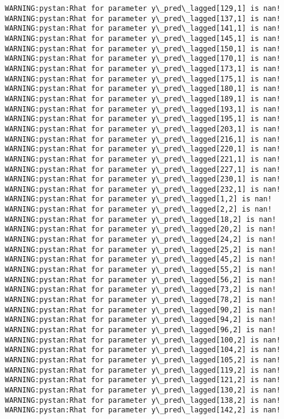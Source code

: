 \documentclass[11pt]{article}
\begin{document}
\begin{Verbatim}[commandchars=\\\{\}]
WARNING:pystan:Rhat for parameter y\_pred\_lagged[129,1] is nan!
WARNING:pystan:Rhat for parameter y\_pred\_lagged[137,1] is nan!
WARNING:pystan:Rhat for parameter y\_pred\_lagged[141,1] is nan!
WARNING:pystan:Rhat for parameter y\_pred\_lagged[145,1] is nan!
WARNING:pystan:Rhat for parameter y\_pred\_lagged[150,1] is nan!
WARNING:pystan:Rhat for parameter y\_pred\_lagged[170,1] is nan!
WARNING:pystan:Rhat for parameter y\_pred\_lagged[173,1] is nan!
WARNING:pystan:Rhat for parameter y\_pred\_lagged[175,1] is nan!
WARNING:pystan:Rhat for parameter y\_pred\_lagged[180,1] is nan!
WARNING:pystan:Rhat for parameter y\_pred\_lagged[189,1] is nan!
WARNING:pystan:Rhat for parameter y\_pred\_lagged[193,1] is nan!
WARNING:pystan:Rhat for parameter y\_pred\_lagged[195,1] is nan!
WARNING:pystan:Rhat for parameter y\_pred\_lagged[203,1] is nan!
WARNING:pystan:Rhat for parameter y\_pred\_lagged[216,1] is nan!
WARNING:pystan:Rhat for parameter y\_pred\_lagged[220,1] is nan!
WARNING:pystan:Rhat for parameter y\_pred\_lagged[221,1] is nan!
WARNING:pystan:Rhat for parameter y\_pred\_lagged[227,1] is nan!
WARNING:pystan:Rhat for parameter y\_pred\_lagged[230,1] is nan!
WARNING:pystan:Rhat for parameter y\_pred\_lagged[232,1] is nan!
WARNING:pystan:Rhat for parameter y\_pred\_lagged[1,2] is nan!
WARNING:pystan:Rhat for parameter y\_pred\_lagged[2,2] is nan!
WARNING:pystan:Rhat for parameter y\_pred\_lagged[18,2] is nan!
WARNING:pystan:Rhat for parameter y\_pred\_lagged[20,2] is nan!
WARNING:pystan:Rhat for parameter y\_pred\_lagged[24,2] is nan!
WARNING:pystan:Rhat for parameter y\_pred\_lagged[25,2] is nan!
WARNING:pystan:Rhat for parameter y\_pred\_lagged[45,2] is nan!
WARNING:pystan:Rhat for parameter y\_pred\_lagged[55,2] is nan!
WARNING:pystan:Rhat for parameter y\_pred\_lagged[56,2] is nan!
WARNING:pystan:Rhat for parameter y\_pred\_lagged[73,2] is nan!
WARNING:pystan:Rhat for parameter y\_pred\_lagged[78,2] is nan!
WARNING:pystan:Rhat for parameter y\_pred\_lagged[90,2] is nan!
WARNING:pystan:Rhat for parameter y\_pred\_lagged[94,2] is nan!
WARNING:pystan:Rhat for parameter y\_pred\_lagged[96,2] is nan!
WARNING:pystan:Rhat for parameter y\_pred\_lagged[100,2] is nan!
WARNING:pystan:Rhat for parameter y\_pred\_lagged[104,2] is nan!
WARNING:pystan:Rhat for parameter y\_pred\_lagged[105,2] is nan!
WARNING:pystan:Rhat for parameter y\_pred\_lagged[119,2] is nan!
WARNING:pystan:Rhat for parameter y\_pred\_lagged[121,2] is nan!
WARNING:pystan:Rhat for parameter y\_pred\_lagged[130,2] is nan!
WARNING:pystan:Rhat for parameter y\_pred\_lagged[138,2] is nan!
WARNING:pystan:Rhat for parameter y\_pred\_lagged[142,2] is nan!

\end{Verbatim}
\end{document}
